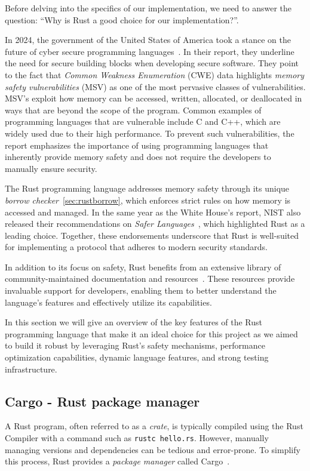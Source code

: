 \documentclass[twoside,11pt]{report}
\theoremstyle{definition}
\theoremstyle{plain}
\begin{document}
Before delving into the specifics of our implementation, we need to answer the question: ``Why is Rust a good choice for our implementation?''.

In 2024, the government of the United States of America took a stance on the future of cyber secure programming languages~\cite{whitehouse2024memorysafe}. In their report, they underline the need for secure building blocks when developing secure software. They point to the fact that \textit{Common Weakness Enumeration} (CWE) data highlights \textit{memory safety vulnerabilities} (MSV) as one of the most pervasive classes of vulnerabilities. MSV's exploit how memory can be accessed, written, allocated, or deallocated in ways that are beyond the scope of the program. Common examples of programming languages that are vulnerable include C and C++, which are widely used due to their high performance. To prevent such vulnerabilities, the report emphasizes the importance of using programming languages that inherently provide memory safety and does not require the developers to manually ensure security.

The Rust programming language addresses memory safety through its unique \textit{borrow checker}~\autoref{sec:rustborrow}, which enforces strict rules on how memory is accessed and managed. In the same year as the White House's report, NIST also released their recommendations on \textit{Safer Languages}~\cite{nistsaferlanguages}, which highlighted Rust as a leading choice. Together, these endorsements underscore that Rust is well-suited for implementing a protocol that adheres to modern security standards.

In addition to its focus on safety, Rust benefits from an extensive library of community-maintained documentation and resources~\cite{rustlangRustProgramming,rustlangPerformanceBook,lurklurkEffectiveRust}. These resources provide invaluable support for developers, enabling them to better understand the language's features and effectively utilize its capabilities.

In this section we will give an overview of the key features of the Rust programming language that make it an ideal choice for this project as we aimed to build it robust by leveraging Rust's safety mechanisms, performance optimization capabilities, dynamic language features, and strong testing infrastructure.

\subsection{Cargo - Rust package manager}\label{sec:cargo}
A Rust program, often referred to as a \textit{crate}, is typically compiled using the Rust Compiler with a command such as \texttt{rustc hello.rs}. However, manually managing versions and dependencies can be tedious and error-prone. To simplify this process, Rust provides a \textit{package manager} called Cargo~\cite{rustlangCargo}.
\end{document}
